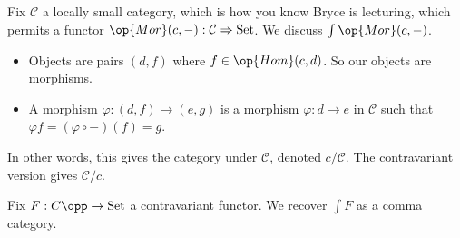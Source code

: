 \begin{example}
	Fix $\mathcal C$ a locally small category, which is how you know Bryce is lecturing, which permits a functor $\op{Mor}(c,-):\mathcal C\Rightarrow\mathrm{Set}$. We discuss $\int\op{Mor}(c,-)$.
	\begin{itemize}
		\item Objects are pairs $(d,f)$ where $f\in\op{Hom}(c,d)$. So our objects are morphisms.
		\item A morphism $\varphi:(d,f)\to(e,g)$ is a morphism $\varphi:d\to e$ in $\mathcal C$ such that $\varphi f=(\varphi\circ-)(f)=g$.
	\end{itemize}
	In other words, this gives the category under $\mathcal C$, denoted $c/\mathcal C$. The contravariant version gives $\mathcal C/c$.
\end{example}
\begin{exe}
	Fix $F:C\opp\to\mathrm{Set}$ a contravariant functor. We recover $\int F$ as a comma category.
\end{exe}
